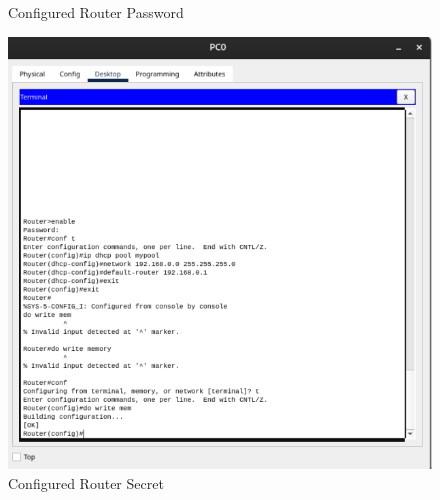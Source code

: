 \documentclass[a4paper,12pt]{article}
\begin{document}
\begin{itemize}
\begin{figure}[!ht]
\begin{minipage}{0.45\textwidth}
                  \caption{Configured Router Password}
                  \label{fig:router_password}
              \end{minipage}
          \end{figure}

          \begin{figure}[!ht]
              \centering
              \begin{minipage}{0.45\textwidth}
                  \centering
                  \includegraphics[width=\textwidth]{img/enable_secret.png}
                  \caption{Configured Router Secret}
                  \label{fig:router_secret}
              \end{minipage}\hfill
              \begin{minipage}{0.45\textwidth}
                  \centering

\end{minipage}
\end{figure}
\end{itemize}
\end{document}
